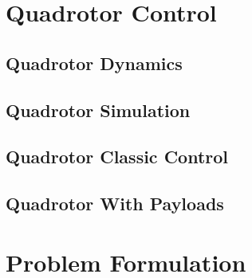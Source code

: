 \section{Quadrotor Control}
\subsection{Quadrotor Dynamics}
\subsection{Quadrotor Simulation}
\subsection{Quadrotor Classic Control}
\subsection{Quadrotor With Payloads}

\section{Problem Formulation}


